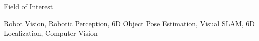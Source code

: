 \begin{rSection}{Field of Interest}
\item Robot Vision, Robotic Perception, 6D Object Pose Estimation, Visual \acf{SLAM}, 6D Localization, Computer Vision 
\end{rSection}


